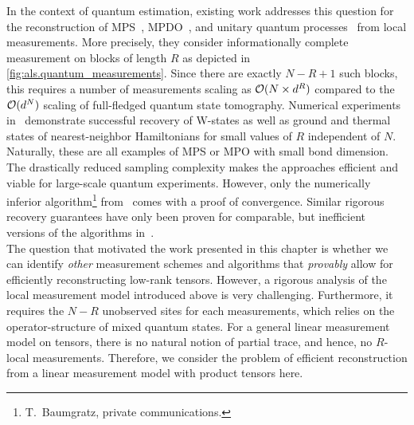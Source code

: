 In the context of quantum estimation, existing work addresses this question for the reconstruction of MPS~\cite{Cramer_2010_Efficient}, MPDO~\cite{Baumgratz_2013_Scalable,Baumgratz_2013_Scalablea,Lanyon_2017_Efficient}, and unitary quantum processes~\cite{Holzaepfel_2014_Scalable} from local measurements.
More precisely, they consider informationally complete measurement on blocks of length $R$ as depicted in \cref{fig:als.quantum_measurements}.
Since there are exactly $N - R + 1$ such blocks, this requires a number of measurements scaling as ${\mathcal{O}}(N \times d^R)$ compared to the ${\mathcal{O}}(d^N)$ scaling of full-fledged quantum state tomography.
Numerical experiments in~\cite{Cramer_2010_Efficient,Baumgratz_2013_Scalable,Baumgratz_2013_Scalablea} demonstrate successful recovery of W-states as well as ground and thermal states of nearest-neighbor Hamiltonians for small values of $R$ independent of $N$.
Naturally, these are all examples of MPS or MPO with small bond dimension.
The drastically reduced sampling complexity makes the approaches efficient and viable for large-scale quantum experiments.
However, only the numerically inferior algorithm\footnote{%
  T.\ Baumgratz, private communications.
}
from~\cite{Baumgratz_2013_Scalable} comes with a proof of convergence.
Similar rigorous recovery guarantees have only been proven for comparable, but inefficient versions of the algorithms in~\cite{Cramer_2010_Efficient,Baumgratz_2013_Scalablea}.\\



The question that motivated the work presented in this chapter is whether we can identify \emph{other} measurement schemes and algorithms that \emph{provably} allow for efficiently reconstructing low-rank tensors.
However, a rigorous analysis of the local measurement model introduced above is very challenging.
Furthermore, it requires  the $N - R$ unobserved sites for each measurements, which relies on the operator-structure of mixed quantum states.
For a general linear measurement model on tensors, there is no natural notion of partial trace, and hence, no $R$-local measurements.
Therefore, we consider the problem of efficient reconstruction from a linear measurement model with product tensors here.

